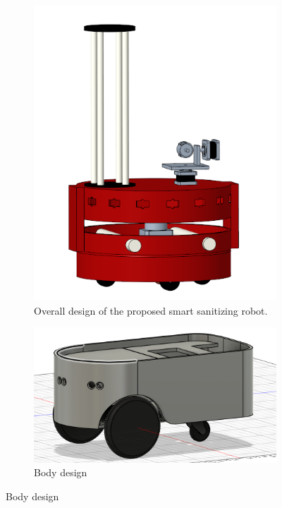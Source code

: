 \documentclass[letterpaper]{article} %
\begin{document}
\begin{figure}[htpb]
  \centering
  \begin{subfigure}[b]{0.5\textwidth}
    \centering
    \includegraphics[scale=0.25]{../figs/img/frontViewScreenshotB}
    \caption{Overall design of the proposed smart sanitizing robot.}
    \label{fig:frontViewScreenshotB}
  \end{subfigure}
  \begin{subfigure}[b]{.5\textwidth}
    \centering
    \includegraphics[scale=0.1]{../figs/img/v2BodyDesign}
    \caption{Body design}

\end{subfigure}
\end{figure}
\end{document}
